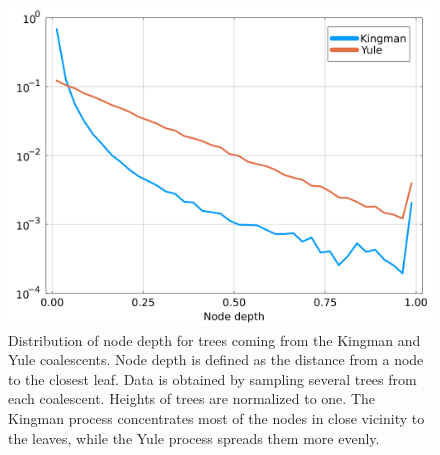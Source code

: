 \begin{figure}[h]
	\centering
	\includegraphics[width=.75\textwidth]{figures/SI/depth_distribution_coalescents.png}
	\caption{
		Distribution of node depth for trees coming from the Kingman and Yule coalescents. 
		Node depth is defined as the distance from a node to the closest leaf. 
		Data is obtained by sampling several trees from each coalescent. 
		Heights of trees are normalized to one. 
		The Kingman process concentrates most of the nodes in close vicinity to the leaves, while the Yule process spreads them more evenly. 
	}
	\label{sfig:depth_distribution_coalescent}
\end{figure}

